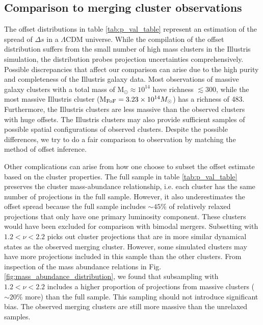 \subsection{Comparison to merging cluster observations}

The offset distributions in table \ref{tab:p_val_table}
represent an estimation of the spread of $\Delta s$ in a $\Lambda$CDM universe.
While the compilation of the offset distribution suffers 
from the small number of high mass clusters in the Illustris simulation, 
the distribution probes projection uncertainties comprehensively. 
Possible discrepancies that affect our comparison can arise
due to the high purity and completeness of the Illustris galaxy data.
Most observations of massive galaxy clusters with a total mass of M$_\odot
\approx 10^{14}$ have richness $\lesssim 300$, while the most massive Illustris
cluster (M$_{\rm FoF} = 3.23 \times 10^{14} M_\odot$) has a richness of 483.
Furthermore, the Illustris clusters are less massive than the observed clusters
with huge offsets. The Illustris clusters may also provide sufficient samples
of possible spatial configurations of observed clusters.
Despite the possible differences, we try to do a
fair comparison to observation by matching the method of offset inference. 

Other complications can arise from how one choose to subset the offset estimate
based on the cluster properties.
The full sample in table \ref{tab:p_val_table} preserves the cluster mass-abundance
relationship, i.e. each cluster has the same number of projections in
the full sample. However, it also underestimates the offset spread because the
full sample includes $\sim 45\%$ of relatively relaxed projections 
that only have one primary luminosity component.  These clusters would
have been excluded for comparison with bimodal mergers. 
Subsetting with $1.2 < \nu < 2.2$ picks out
cluster projections that are in more similar dynamical states as the observed merging
cluster. 
However, some simulated clusters may have more projections included in this sample
than the other clusters. From inspection of the mass abundance relations in 
Fig. \ref{fig:mass_abundance_distribution}, we found that subsampling with $1.2 <
\nu <2.2$ includes a higher proportion of projections from massive clusters
($\sim 20\%$ more) than 
the full sample. This sampling should not introduce significant bias. 
The observed merging clusters are still more massive than the unrelaxed samples. 

